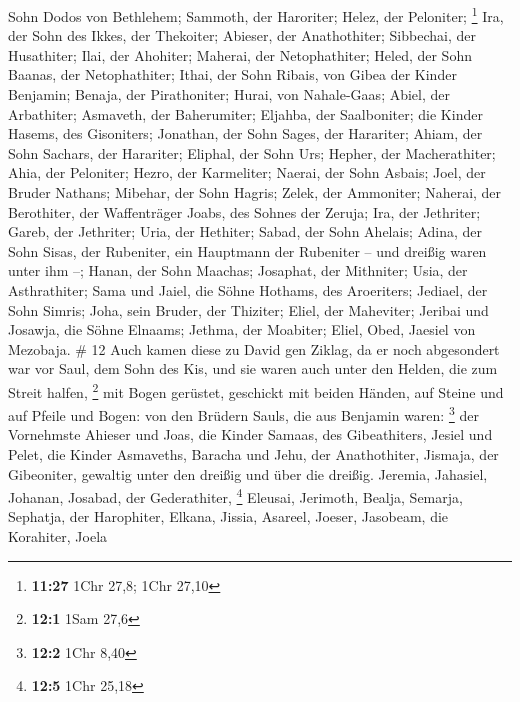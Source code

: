 Sohn Dodos von Bethlehem;  Sammoth, der Haroriter; Helez,
der Peloniter; \footnote{\textbf{11:27} 1Chr 27,8; 1Chr 27,10}
 Ira, der Sohn des Ikkes, der Thekoiter; Abieser, der
Anathothiter;  Sibbechai, der Husathiter; Ilai, der
Ahohiter;  Maherai, der Netophathiter; Heled, der Sohn
Baanas, der Netophathiter;  Ithai, der Sohn Ribais, von
Gibea der Kinder Benjamin; Benaja, der Pirathoniter; 
Hurai, von Nahale-Gaas; Abiel, der Arbathiter;  Asmaveth,
der Baherumiter; Eljahba, der Saalboniter;  die Kinder
Hasems, des Gisoniters; Jonathan, der Sohn Sages, der Harariter;
 Ahiam, der Sohn Sachars, der Harariter; Eliphal, der
Sohn Urs;  Hepher, der Macherathiter; Ahia, der
Peloniter;  Hezro, der Karmeliter; Naerai, der Sohn
Asbais;  Joel, der Bruder Nathans; Mibehar, der Sohn
Hagris;  Zelek, der Ammoniter; Naherai, der Berothiter,
der Waffenträger Joabs, des Sohnes der Zeruja;  Ira, der
Jethriter; Gareb, der Jethriter;  Uria, der Hethiter;
Sabad, der Sohn Ahelais;  Adina, der Sohn Sisas, der
Rubeniter, ein Hauptmann der Rubeniter -- und dreißig waren unter ihm
--;  Hanan, der Sohn Maachas; Josaphat, der Mithniter;
 Usia, der Asthrathiter; Sama und Jaiel, die Söhne
Hothams, des Aroeriters;  Jediael, der Sohn Simris; Joha,
sein Bruder, der Thiziter;  Eliel, der Maheviter; Jeribai
und Josawja, die Söhne Elnaams; Jethma, der Moabiter; 
Eliel, Obed, Jaesiel von Mezobaja. \# 12  Auch kamen diese
zu David gen Ziklag, da er noch abgesondert war vor Saul, dem Sohn des
Kis, und sie waren auch unter den Helden, die zum Streit halfen,
\footnote{\textbf{12:1} 1Sam 27,6}  mit Bogen gerüstet,
geschickt mit beiden Händen, auf Steine und auf Pfeile und Bogen: von
den Brüdern Sauls, die aus Benjamin waren: \footnote{\textbf{12:2} 1Chr
  8,40}  der Vornehmste Ahieser und Joas, die Kinder
Samaas, des Gibeathiters, Jesiel und Pelet, die Kinder Asmaveths,
Baracha und Jehu, der Anathothiter,  Jismaja, der
Gibeoniter, gewaltig unter den dreißig und über die dreißig.
 Jeremia, Jahasiel, Johanan, Josabad, der Gederathiter,
\footnote{\textbf{12:5} 1Chr 25,18}  Eleusai, Jerimoth,
Bealja, Semarja, Sephatja, der Harophiter,  Elkana,
Jissia, Asareel, Joeser, Jasobeam, die Korahiter,  Joela
